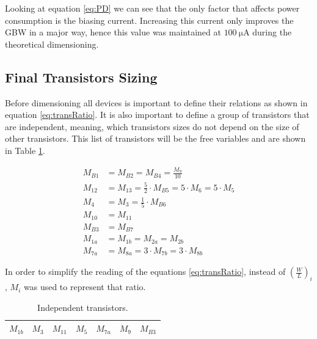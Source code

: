 Looking at equation \ref{eq:PD} we can see that the only factor that affects power consumption is the biasing current. Increasing this current only improves the GBW in a major way, hence this value was maintained at $\SI{100}{\micro\ampere}$ during the theoretical dimensioning.
\pagebreak
\subsection{Final Transistors Sizing}

Before dimensioning all devices is important to define their relations as shown in equation \ref{eq:transRatio}. It is also important to define a group of transistors that are independent, meaning, which transistors sizes do not depend on the size of other transistors. This list of transistors will be the free variables and are shown in Table \ref{tab:FreeMos}.

\begin{align}
    \label{eq:transRatio}
    M_{B1} & = M_{B2} = M_{B4} = \frac{M_9}{10}\\
    M_{12} &= M_{13} = \frac{5}{2}\cdot M_{B5} = 5\cdot M_{6} = 5\cdot M_{5}\\
    M_4 &= M_{3} = \frac{1}{5} \cdot M_{B6}\\
    M_{10} &= M_{11}\\
    M_{B3} & = M_{B7} \\
    M_{1a} & = M_{1b} = M_{2a} = M_{2b} \\
    M_{7a} & = M_{8a} = 3 \cdot M_{7b} = 3 \cdot M_{8b}
\end{align}

In order to simplify the reading of the equations \ref{eq:transRatio}, instead of $\left(\frac{W}{L}\right)_{i}$, $M_{i}$ was used to represent that ratio.

\begin{table}[h]
    \centering
    \caption{Independent transistors.}
    \begin{tabularx}{\textwidth}{>{\centering\arraybackslash}X 
                                >{\centering\arraybackslash}X  
                                >{\centering\arraybackslash}X
                                >{\centering\arraybackslash}X
                                >{\centering\arraybackslash}X
                                >{\centering\arraybackslash}X
                                >{\centering\arraybackslash}X
        }
        \toprule
        $M_{1b}$ & $M_{3}$ & $M_{11}$ & $M_{5}$ & $M_{7a}$ & $M_{9}$ & $M_{B3}$ \\
        \bottomrule
    \end{tabularx}
    \label{tab:FreeMos}
\end{table}

